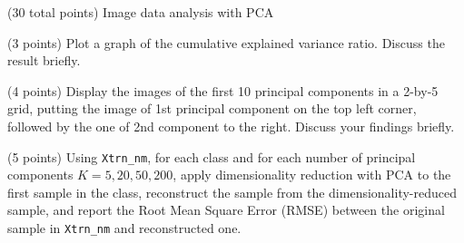 \documentclass[12pt]{article}
\begin{document}
\begin{question}{(30 total points) Image data analysis with PCA}
\begin{subquestion}{(3 points)
       Plot a graph of the cumulative explained variance ratio.
       Discuss the result briefly.
     }
   \end{subquestion}

   \begin{subquestion}{(4 points)
      Display the images of the first 10 principal components in
      a 2-by-5 grid, putting the image of 1st principal component on
      the top left corner, followed by the one of 2nd component to the right.
      Discuss your findings briefly.
     } \label{Q1.disp.pca}
   

  


   \end{subquestion}

   \begin{subquestion}{(5 points)
       Using \texttt{Xtrn\_nm}, 
       for each class and for each number of principal components $K =
       5, 20, 50, 200$, apply dimensionality reduction with PCA to the
       first sample in the class, reconstruct the sample from the
       dimensionality-reduced sample, and 
       report the Root Mean Square Error (RMSE) between the
       original sample in {\tt Xtrn\_nm} and reconstructed one.
     } \label{Q1.6}

     


\end{subquestion}
\end{question}
\end{document}
